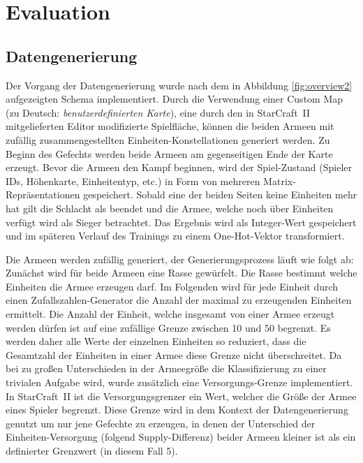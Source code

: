 \section{Evaluation}
\label{Eval}

\subsection{Datengenerierung}
\label{datagen}

Der Vorgang der Datengenerierung wurde nach dem in Abbildung \ref{fig:overview2} aufgezeigten Schema implementiert. Durch die Verwendung einer Custom Map (zu Deutsch: \textit{benutzerdefinierten Karte}), eine durch den in StarCraft~II mitgelieferten Editor modifizierte Spielfläche, können die beiden Armeen mit zufällig zusammengestellten Einheiten-Konstellationen generiert werden. Zu Beginn des Gefechts werden beide Armeen am gegenseitigen Ende der Karte erzeugt. Bevor die Armeen den Kampf beginnen, wird der Spiel-Zustand (Spieler IDs, Höhenkarte, Einheitentyp, etc.) in Form von mehreren Matrix-Repräsentationen gespeichert. Sobald eine der beiden Seiten keine Einheiten mehr hat gilt die Schlacht als beendet und die Armee, welche noch über Einheiten verfügt wird als Sieger betrachtet. Das Ergebnis wird als Integer-Wert gespeichert und im späteren Verlauf des Trainings zu einem One-Hot-Vektor transformiert. 

Die Armeen werden zufällig generiert, der Generierungsprozess läuft wie folgt ab: Zunächst wird für beide Armeen eine Rasse gewürfelt. Die Rasse bestimmt welche Einheiten die Armee erzeugen darf. Im Folgenden wird für jede Einheit durch einen Zufallszahlen-Generator die Anzahl der maximal zu erzeugenden Einheiten ermittelt. Die Anzahl der Einheit, welche insgesamt von einer Armee erzeugt werden dürfen ist auf eine zufällige Grenze zwischen 10 und 50 begrenzt. Es werden daher alle Werte der einzelnen Einheiten so reduziert, dass die Gesamtzahl der Einheiten in einer Armee diese Grenze nicht überschreitet. Da bei zu großen Unterschieden in der Armeegröße die Klassifizierung zu einer trivialen Aufgabe wird, wurde zusätzlich eine Versorgungs-Grenze implementiert. In StarCraft~II ist die Versorgungsgrenzer ein Wert, welcher die Größe der Armee eines Spieler begrenzt. Diese Grenze wird in dem Kontext der Datengenerierung genutzt um nur jene Gefechte zu erzeugen, in denen der Unterschied der Einheiten-Versorgung (folgend Supply-Differenz) beider Armeen kleiner ist als ein definierter Grenzwert (in diesem Fall 5).

